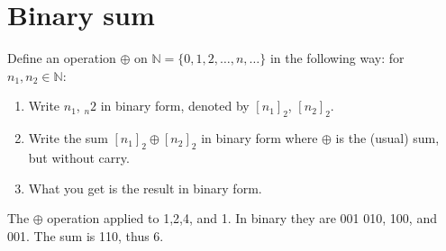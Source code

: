 \section{Binary sum}

Define an operation $\oplus$ on $\mathbb{N}=\{0, 1, 2, \dots, n, \dots \}$ in the following way: for $n_1,n_2 \in \mathbb{N}$:
\begin{enumerate}
    \item Write $n_1$, $_n2$ in binary form, denoted by $[n_1]_2$, $[n_2]_2$. 
    \item Write the sum $[n_1]_2 \oplus [n_2]_2$ in binary form where $\oplus$ is the (usual) sum, but without carry.
    \item What you get is the result in binary form. 
\end{enumerate}

\begin{example}
    The $\oplus$ operation applied to 1,2,4, and 1.
    In binary they are 001 010, 100, and 001. 
    The sum is 110, thus 6. 
\end{example}
